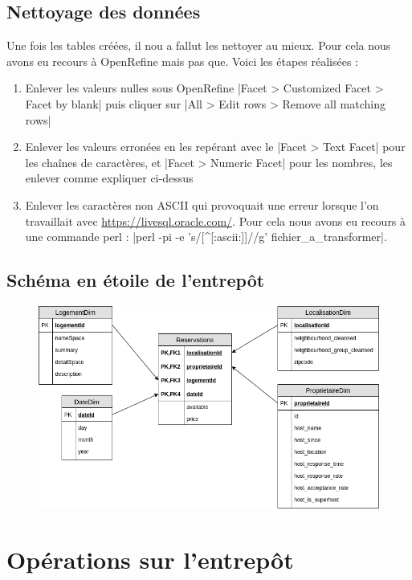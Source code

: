 \documentclass[11pt, a4paper]{article}
\newcommand\tab{\hspace*{12.5mm}}
\begin{document}
\subsection{Nettoyage des données}
\tab Une fois les tables créées, il nou a fallut les nettoyer au mieux. Pour cela nous avons eu recours à OpenRefine mais pas que. Voici les étapes réalisées :
\begin{enumerate}
   \item Enlever les valeurs nulles sous OpenRefine \spverb|Facet > Customized Facet > Facet by blank| puis cliquer sur \spverb|All > Edit rows > Remove all matching rows|
   \item Enlever les valeurs erronées en les repérant avec le \spverb|Facet > Text Facet| pour les chaînes de caractères, et \spverb|Facet > Numeric Facet| pour les nombres, les enlever comme expliquer ci-dessus
   \item Enlever les caractères non ASCII qui provoquait une erreur lorsque l'on travaillait avec \url{https://livesql.oracle.com/}. Pour cela nous avons eu recours à une commande perl : \spverb|perl -pi -e 's/[^[:ascii:]]//g' fichier_a_transformer|.

\end{enumerate}

\subsection{Schéma en étoile de l'entrepôt}

\begin{figure}[h]
   \begin{center}
      \includegraphics[width=0.9\linewidth]{./schema_entrepot.png}
   \end{center}
\end{figure}

\section{Opérations sur l'entrepôt}
\end{document}
